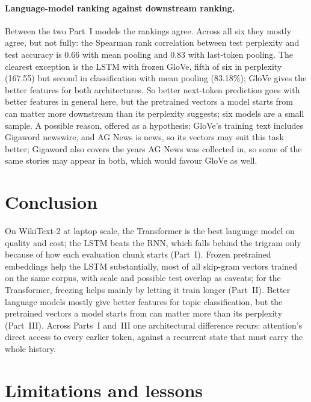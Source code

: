 \documentclass[10pt]{article}
\begin{document}
\paragraph{Language-model ranking against downstream ranking.} Between the two Part~I models the rankings agree. Across all six they mostly agree, but not fully: the Spearman rank correlation between test perplexity and test accuracy is 0.66 with mean pooling and 0.83 with last-token pooling. The clearest exception is the LSTM with frozen GloVe, fifth of six in perplexity (167.55) but second in classification with mean pooling (83.18\%); GloVe gives the better features for both architectures. So better next-token prediction goes with better features in general here, but the pretrained vectors a model starts from can matter more downstream than its perplexity suggests; six models are a small sample. A possible reason, offered as a hypothesis: GloVe's training text includes Gigaword newswire, and AG News is news, so its vectors may suit this task better; Gigaword also covers the years AG News was collected in, so some of the same stories may appear in both, which would favour GloVe as well.

\section{Conclusion}
On WikiText-2 at laptop scale, the Transformer is the best language model on quality and cost; the LSTM beats the RNN, which falls behind the trigram only because of how each evaluation chunk starts (Part~I). Frozen pretrained embeddings help the LSTM substantially, most of all skip-gram vectors trained on the same corpus, with scale and possible test overlap as caveats; for the Transformer, freezing helps mainly by letting it train longer (Part~II). Better language models mostly give better features for topic classification, but the pretrained vectors a model starts from can matter more than its perplexity (Part~III). Across Parts~I and~III one architectural difference recurs: attention's direct access to every earlier token, against a recurrent state that must carry the whole history.

\section{Limitations and lessons}
\end{document}

